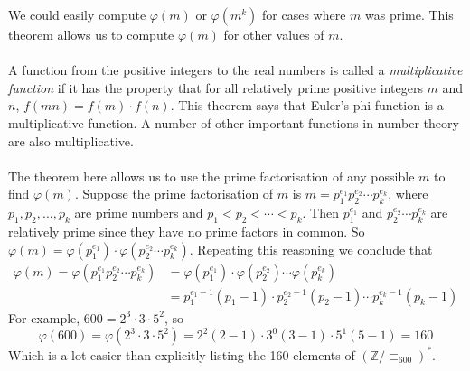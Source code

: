 \documentclass{report}
\theoremstyle{definition}
\begin{document}
We could easily compute $\varphi(m)$ or $\varphi(m^k)$ for cases where $m$ was prime. This theorem allows us to compute $\varphi(m)$ for other
values of $m$.\\
\vspace{1mm}\\
A function from the positive integers to the real numbers is called a \textit{multiplicative function} if it has the property that for all 
relatively prime positive integers $m$ and $n$, $f(mn)=f(m)\cdot f(n)$. 
This theorem says that Euler's phi function is a multiplicative function. A number of other important functions in number theory are also 
multiplicative.\\
\vspace{1mm}\\
The theorem here allows us to use the prime factorisation of any possible $m$ to find $\varphi(m)$. Suppose the prime factorisation of $m$ 
is $m=p_1^{e_1}p_2^{e_2}\cdots p_k^{e_k}$, where $p_1,p_2,\ldots,p_k$ are
prime numbers and $p_1<p_2<\cdots<p_k$. Then $p_1^{e_1}$ and $p_2^{e_2}\cdots p_k^{e_k}$ are relatively prime since they have no prime
factors in common. So $\varphi(m)=\varphi(p_1^{e_1})\cdot\varphi(p_2^{e_2}\cdots p_k^{e_k})$. Repeating this reasoning we conclude that
\begin{align*}
\varphi(m)=\varphi(p_1^{e_1}p_2^{e_2}\cdots p_k^{e_k})&=\varphi(p_1^{e_1})\cdot\varphi(p_2^{e_2})\cdots\varphi(p_k^{e_k})\\
&=p_1^{e_1-1}(p_1-1)\cdot p_2^{e_2-1}(p_2-1)\cdots p_k^{e_k-1}(p_k-1)
\end{align*}
For example, $600=2^3\cdot3\cdot5^2$, so
\begin{equation*}
\varphi(600)=\varphi(2^3\cdot3\cdot5^2)=2^2(2-1)\cdot3^0(3-1)\cdot5^1(5-1)=160
\end{equation*}
Which is a lot easier than explicitly listing the 160 elements of $(\mathbb Z/\equiv_{600})^*$.
\newpage
\end{document}
